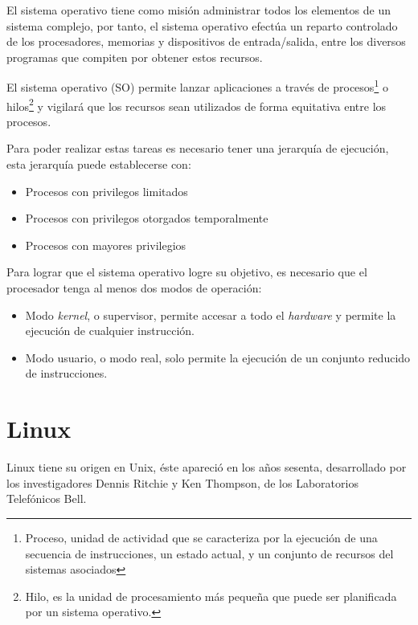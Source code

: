 El sistema operativo tiene como misión administrar todos los elementos de un
sistema complejo, por tanto, el sistema operativo efectúa un reparto controlado
de los procesadores, memorias y dispositivos de entrada/salida, entre los
diversos programas que compiten por obtener estos recursos.

El sistema operativo (SO) permite lanzar aplicaciones a través de
procesos\footnote{Proceso, unidad de actividad que se caracteriza por la
ejecución de una secuencia de instrucciones, un estado actual, y un conjunto de
recursos del sistemas asociados\cite{tanenbaum}} o hilos\footnote{Hilo,  es la
unidad de procesamiento más pequeña que puede ser planificada por un sistema
operativo.} y vigilará que los recursos sean utilizados de forma equitativa
entre los procesos.

Para poder realizar estas tareas es necesario tener una jerarquía de ejecución,
esta jerarquía puede establecerse con:

\begin{itemize}

 \item Procesos con privilegos limitados
 \item Procesos con privilegos otorgados temporalmente
 \item Procesos con mayores privilegios
 
\end{itemize}

Para lograr que el sistema operativo logre su objetivo, es necesario que el
procesador tenga al menos dos modos de operación:

\begin{itemize}

 \item Modo \emph{kernel}, o supervisor, permite accesar a todo el
\emph{hardware} y
  permite la ejecución de cualquier instrucción.
 \item Modo usuario, o modo real, solo permite la ejecución de un conjunto
  reducido de instrucciones\cite{nsistemas}.
 
\end{itemize}

\section{Linux}


Linux tiene su origen en Unix, éste apareció en los años sesenta, desarrollado
por los investigadores Dennis Ritchie y Ken Thompson, de los Laboratorios
Telefónicos Bell.

